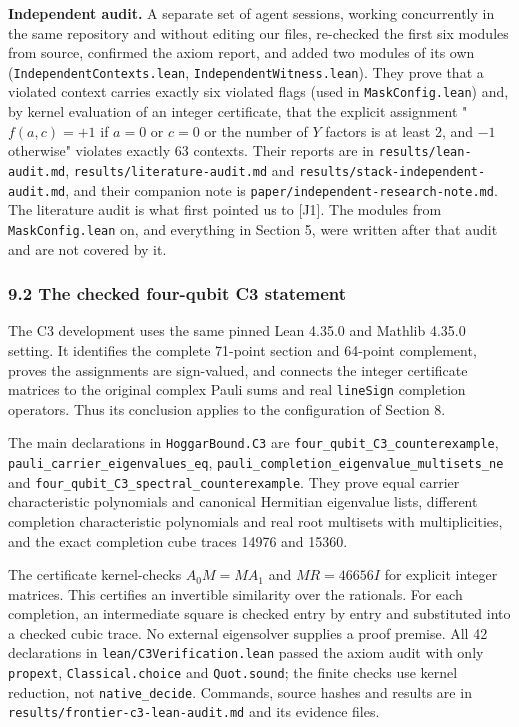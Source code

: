 \documentclass[11pt,a4paper]{article}
\begin{document}
\textbf{Independent audit.} A separate set of agent sessions, working concurrently in the same repository
and without editing our files, re-checked the first six modules from source, confirmed the axiom
report, and added two modules of its own (\nolinkurl{IndependentContexts.lean}, \nolinkurl{IndependentWitness.lean}). They
prove that a violated context carries exactly six violated flags (used in \texttt{MaskConfig.lean}) and, by
kernel evaluation of an integer certificate, that the explicit assignment
"\(f(a,c) = +1\) if \(a = 0\) or \(c = 0\) or the number of \(Y\) factors is at least 2, and \(-1\) otherwise"
violates exactly 63 contexts. Their reports are in \nolinkurl{results/lean-audit.md},
\nolinkurl{results/literature-audit.md} and \nolinkurl{results/stack-independent-audit.md}, and their companion note is
\nolinkurl{paper/independent-research-note.md}. The literature audit is what first pointed us to {[}J1{]}. The
modules from \texttt{MaskConfig.lean} on, and everything in Section 5, were written after that audit and are
not covered by it.

\subsubsection{9.2 The checked four-qubit C3 statement}\label{92-the-checked-four-qubit-c3-statement}

The C3 development uses the same pinned Lean 4.35.0 and Mathlib 4.35.0 setting. It identifies the
complete 71-point section and 64-point complement, proves the assignments are sign-valued, and
connects the integer certificate matrices to the original complex Pauli sums and real \texttt{lineSign}
completion operators. Thus its conclusion applies to the configuration of Section 8.

The main declarations in \texttt{HoggarBound.C3} are \nolinkurl{four_qubit_C3_counterexample},
\nolinkurl{pauli_carrier_eigenvalues_eq}, \nolinkurl{pauli_completion_eigenvalue_multisets_ne} and
\nolinkurl{four_qubit_C3_spectral_counterexample}. They prove equal carrier characteristic polynomials and
canonical Hermitian eigenvalue lists, different completion characteristic polynomials and real root
multisets with multiplicities, and the exact completion cube traces 14976 and 15360.

The certificate kernel-checks \(A_0M=MA_1\) and \(MR=46656I\) for explicit integer matrices. This
certifies an invertible similarity over the rationals. For each completion, an intermediate square
is checked entry by entry and substituted into a checked cubic trace. No external eigensolver supplies
a proof premise. All 42 declarations in \nolinkurl{lean/C3Verification.lean} passed the axiom audit with only
\texttt{propext}, \texttt{Classical.choice} and \texttt{Quot.sound}; the finite checks use kernel reduction, not
\texttt{native\_decide}. Commands, source hashes and results are in \nolinkurl{results/frontier-c3-lean-audit.md} and
its evidence files.
\end{document}
